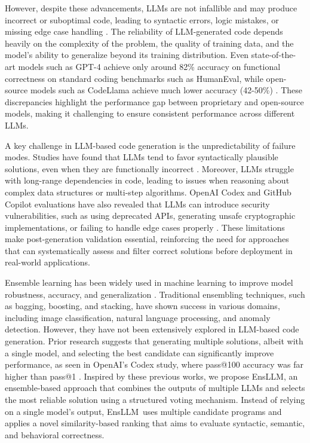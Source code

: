 \documentclass{article}
\newcommand{\tool}{EnsLLM}
\begin{document}
However, despite these advancements, LLMs are not infallible and may produce incorrect or suboptimal code, leading to syntactic errors, logic mistakes, or missing edge case handling \cite{chen2021evaluating}. The reliability of LLM-generated code depends heavily on the complexity of the problem, the quality of training data, and the model’s ability to generalize beyond its training distribution. Even state-of-the-art models such as GPT-4 achieve only around 82\% accuracy on functional correctness on standard coding benchmarks such as HumanEval, while open-source models such as CodeLlama achieve much lower accuracy (42-50\%) \cite{bubeck2023sparks, ziemniak2023codellama}. These discrepancies highlight the performance gap between proprietary and open-source models, making it challenging to ensure consistent performance across different LLMs.

A key challenge in LLM-based code generation is the unpredictability of failure modes. Studies have found that LLMs tend to favor syntactically plausible solutions, even when they are functionally incorrect \cite{li2022competition}. Moreover, LLMs struggle with long-range dependencies in code, leading to issues when reasoning about complex data structures or multi-step algorithms. OpenAI Codex and GitHub Copilot evaluations have also revealed that LLMs can introduce security vulnerabilities, such as using deprecated APIs, generating unsafe cryptographic implementations, or failing to handle edge cases properly \cite{pearce2022asleep}. These limitations make post-generation validation essential, reinforcing the need for approaches that can systematically assess and filter correct solutions before deployment in real-world applications.

Ensemble learning has been widely used in machine learning to improve model robustness, accuracy, and generalization \cite{mienye2022survey}. Traditional ensembling techniques, such as bagging, boosting, and stacking, have shown success in various domains, including image classification, natural language processing, and anomaly detection. However, they have not been extensively explored in LLM-based code generation. Prior research suggests that generating multiple solutions, albeit with a single model, and selecting the best candidate can significantly improve performance, as seen in OpenAI’s Codex study, where pass@100 accuracy was far higher than pass@1 \cite{chen2021evaluating}. Inspired by these previous works, we propose \tool, an ensemble-based approach that combines the outputs of multiple LLMs and selects the most reliable solution using a structured voting mechanism. Instead of relying on a single model’s output, \tool\ uses multiple candidate programs and applies a novel similarity-based ranking that aims to evaluate syntactic, semantic, and behavioral correctness.
\end{document}
